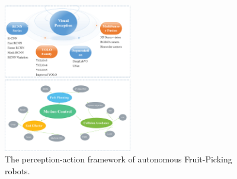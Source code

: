 \documentclass[a4paper,fleqn]{cas-dc}
\begin{document}
\begin{figure}[h!]
    \centering
    \includegraphics[width=0.5\textwidth]{fig_struct4.png}
    \caption{The perception-action framework of autonomous Fruit-Picking robots.}
    \label{fig:struct}
\end{figure}
\end{document}
